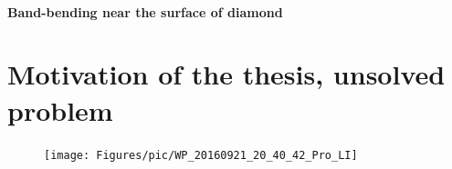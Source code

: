  
\paragraph{Band-bending near the surface of diamond}  



\section[Motivation of the thesis, unsolved problem]{Motivation of the thesis, unsolved problem}
\FloatBarrier
\begin{figure}[h]
	\centering
	\texttt{[image: Figures/pic/WP\_20160921\_20\_40\_42\_Pro\_LI]}
	\caption{}
	\label{fig:wp20160921204042proli}
\end{figure}
\FloatBarrier
